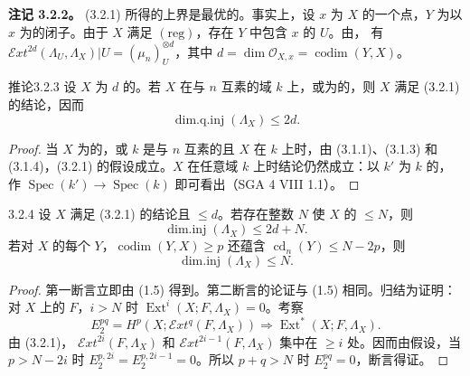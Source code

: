 \textbf{注记 3.2.2。} (3.2.1) 所得的上界是最优的。事实上，设 $x$ 为 $X$ 的一个点，$Y$ 为以 $x$ 为的闭子。由于 $X$ 满足 $(\mathrm{reg})$，存在 $Y$ 中包含 $x$ 的 $U$。由，
有 $\mathscr Ext^{2d}(\Lambda_U,\Lambda_X)|U=(\mu_n)_U^{\otimes d}$，其中 $d=\dim\mathscr O_{X,x}=\operatorname{codim}(Y,X)$。
\begin{SGAresult}{推论}{3.2.3}
设 $X$ 为 $d$ 的。若 $X$ 在与 $n$ 互素的域 $k$ 上，或为的，则 $X$ 满足 (3.2.1) 的结论，因而
\[\operatorname{dim.q.inj}(\Lambda_X)\leq2d.\]
\end{SGAresult}
\begin{proof}
当 $X$ 为的，或 $k$ 是与 $n$ 互素的且 $X$ 在 $k$ 上时，由 (3.1.1)、(3.1.3) 和 (3.1.4)，(3.2.1) 的假设成立。$X$ 在任意域 $k$ 上时结论仍然成立：以 $k'$ 为 $k$ 的，作 $\operatorname{Spec}(k')\to\operatorname{Spec}(k)$ 即可看出（SGA 4 VIII 1.1）。
\end{proof}
\begin{SGAresult}{}{3.2.4}
设 $X$ 满足 (3.2.1) 的结论且 $\leq d$。若存在整数 $N$ 使 $X$ 的 $\leq N$，则
\[\operatorname{dim.inj}(\Lambda_X)\leq2d+N.\]
若对 $X$ 的每个 $Y$，$\operatorname{codim}(Y,X)\geq p$ 还蕴含 $\operatorname{cd}_n(Y)\leq N-2p$，则
\[\operatorname{dim.inj}(\Lambda_X)\leq N.\]
\end{SGAresult}
\begin{proof}
第一断言立即由 (1.5) 得到。第二断言的论证与 (1.5) 相同。归结为证明：对 $X$ 上的 $F$，$i>N$ 时 $\operatorname{Ext}^i(X;F,\Lambda_X)=0$。考察
\[
E_2^{pq}=H^p(X;\mathscr Ext^q(F,\Lambda_X))\Longrightarrow\operatorname{Ext}^{*}(X;F,\Lambda_X).
\]
由 (3.2.1)， $\mathscr Ext^{2i}(F,\Lambda_X)$ 和 $\mathscr Ext^{2i-1}(F,\Lambda_X)$ 集中在 $\geq i$ 处。因而由假设，当 $p>N-2i$ 时 $E_2^{p,2i}=E_2^{p,2i-1}=0$。所以 $p+q>N$ 时 $E_2^{pq}=0$，断言得证。
\end{proof}
